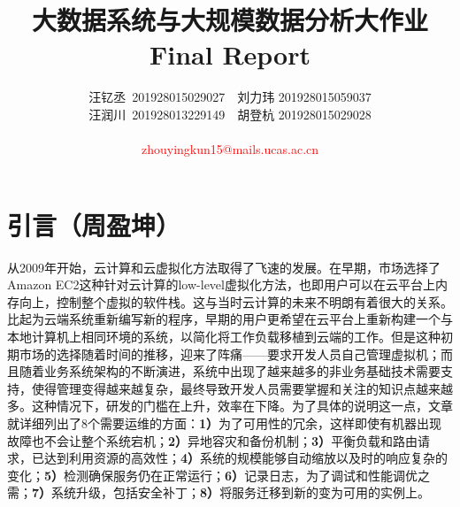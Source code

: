 \documentclass[11pt]{article}
\title{大数据系统与大规模数据分析大作业Final Report}
\author{汪钇丞\ 201928015029027\ \ 刘力玮 201928015059037 \\
		汪润川\ 201928013229149\ \ 胡登杭 201928015029028 \\
	\textcolor{red}{\Name\ \ \SID} \\
	\textcolor{red}{zhouyingkun15@mails.ucas.ac.cn}}
\date{}
\begin{document}
\maketitle
\section{引言（周盈坤）}
从2009年开始，云计算和云虚拟化方法取得了飞速的发展。在早期，市场选择了Amazon EC2这种针对云计算的low-level虚拟化方法\cite{jonas2019cloud}，也即用户可以在云平台上内存向上，控制整个虚拟的软件栈。这与当时云计算的未来不明朗有着很大的关系。比起为云端系统重新编写新的程序，早期的用户更希望在云平台上重新构建一个与本地计算机上相同环境的系统，以简化将工作负载移植到云端的工作。但是这种初期市场的选择随着时间的推移，迎来了阵痛——要求开发人员自己管理虚拟机；而且随着业务系统架构的不断演进，系统中出现了越来越多的非业务基础技术需要支持，使得管理变得越来越复杂，最终导致开发人员需要掌握和关注的知识点越来越多。这种情况下，研发的门槛在上升，效率在下降。为了具体的说明这一点，文章\cite{jonas2019cloud}就详细列出了8个需要运维的方面：\textbf{1）}为了可用性的冗余，这样即使有机器出现故障也不会让整个系统宕机；\textbf{2）}异地容灾和备份机制；\textbf{3）}平衡负载和路由请求，已达到利用资源的高效性；\textbf{4）}系统的规模能够自动缩放以及时的响应复杂的变化；\textbf{5）}检测确保服务仍在正常运行；\textbf{6）}记录日志，为了调试和性能调优之需；\textbf{7）}系统升级，包括安全补丁；\textbf{8）}将服务迁移到新的变为可用的实例上。
\end{document}

